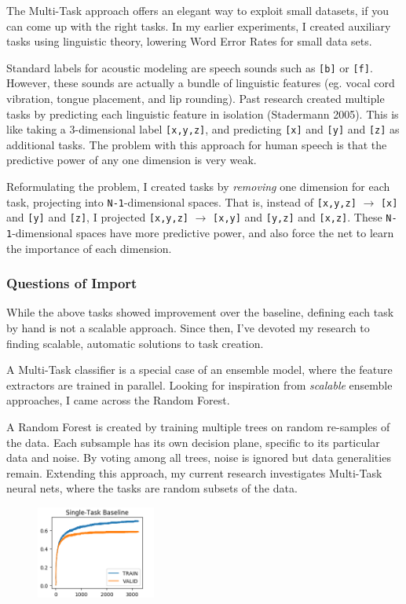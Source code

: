 \documentclass[12pt,a4paper]{article}
\begin{document}
The Multi-Task approach offers an elegant way to exploit small datasets, if you can come up with the right tasks. In my earlier experiments, I created auxiliary tasks using linguistic theory, lowering Word Error Rates for small data sets.

Standard labels for acoustic modeling are speech sounds such as \texttt{[b]} or \texttt{[f]}. However, these sounds are actually a bundle of linguistic features (eg. vocal cord vibration, tongue placement, and lip rounding). Past research created multiple tasks by predicting each linguistic feature in isolation (Stadermann 2005). This is like taking a 3-dimensional label \texttt{[x,y,z]}, and predicting \texttt{[x]} and \texttt{[y]} and \texttt{[z]} as additional tasks. The problem with this approach for human speech is that the predictive power of any one dimension is very weak.

Reformulating the problem, I created tasks by \textit{removing} one dimension for each task, projecting into \texttt{N-1}-dimensional spaces. That is, instead of \texttt{[x,y,z]} $\rightarrow$ \texttt{[x]} and \texttt{[y]} and \texttt{[z]}, I projected \texttt{[x,y,z]} $\rightarrow$ \texttt{[x,y]} and \texttt{[y,z]} and \texttt{[x,z]}. These \texttt{N-1}-dimensional spaces have more predictive power, and also force the net to learn the importance of each dimension.

\subsubsection*{Questions of Import}

While the above tasks showed improvement over the baseline, defining each task by hand is not a scalable approach. Since then, I've devoted my research to finding scalable, automatic solutions to task creation.

A Multi-Task classifier is a special case of an ensemble model, where the feature extractors are trained in parallel. Looking for inspiration from \textit{scalable} ensemble approaches, I came across the Random Forest.

A Random Forest is created by training multiple trees on random re-samples of the data. Each subsample has its own decision plane, specific to its particular data and noise. By voting among all trees, noise is ignored but data generalities remain. Extending this approach, my current research investigates Multi-Task neural nets, where the tasks are random subsets of the data.


\begin{figure}
\centering
\includegraphics[width=0.35\textwidth]{figs/stl.png}
\end{figure}
\end{document}
